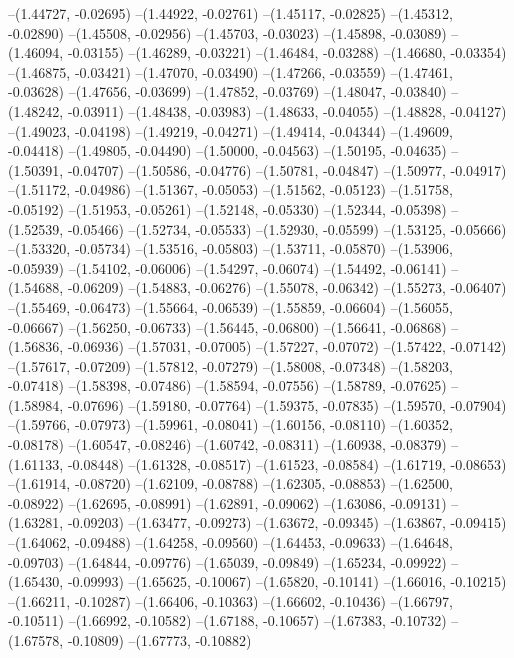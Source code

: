--(1.44727, -0.02695)
--(1.44922, -0.02761)
--(1.45117, -0.02825)
--(1.45312, -0.02890)
--(1.45508, -0.02956)
--(1.45703, -0.03023)
--(1.45898, -0.03089)
--(1.46094, -0.03155)
--(1.46289, -0.03221)
--(1.46484, -0.03288)
--(1.46680, -0.03354)
--(1.46875, -0.03421)
--(1.47070, -0.03490)
--(1.47266, -0.03559)
--(1.47461, -0.03628)
--(1.47656, -0.03699)
--(1.47852, -0.03769)
--(1.48047, -0.03840)
--(1.48242, -0.03911)
--(1.48438, -0.03983)
--(1.48633, -0.04055)
--(1.48828, -0.04127)
--(1.49023, -0.04198)
--(1.49219, -0.04271)
--(1.49414, -0.04344)
--(1.49609, -0.04418)
--(1.49805, -0.04490)
--(1.50000, -0.04563)
--(1.50195, -0.04635)
--(1.50391, -0.04707)
--(1.50586, -0.04776)
--(1.50781, -0.04847)
--(1.50977, -0.04917)
--(1.51172, -0.04986)
--(1.51367, -0.05053)
--(1.51562, -0.05123)
--(1.51758, -0.05192)
--(1.51953, -0.05261)
--(1.52148, -0.05330)
--(1.52344, -0.05398)
--(1.52539, -0.05466)
--(1.52734, -0.05533)
--(1.52930, -0.05599)
--(1.53125, -0.05666)
--(1.53320, -0.05734)
--(1.53516, -0.05803)
--(1.53711, -0.05870)
--(1.53906, -0.05939)
--(1.54102, -0.06006)
--(1.54297, -0.06074)
--(1.54492, -0.06141)
--(1.54688, -0.06209)
--(1.54883, -0.06276)
--(1.55078, -0.06342)
--(1.55273, -0.06407)
--(1.55469, -0.06473)
--(1.55664, -0.06539)
--(1.55859, -0.06604)
--(1.56055, -0.06667)
--(1.56250, -0.06733)
--(1.56445, -0.06800)
--(1.56641, -0.06868)
--(1.56836, -0.06936)
--(1.57031, -0.07005)
--(1.57227, -0.07072)
--(1.57422, -0.07142)
--(1.57617, -0.07209)
--(1.57812, -0.07279)
--(1.58008, -0.07348)
--(1.58203, -0.07418)
--(1.58398, -0.07486)
--(1.58594, -0.07556)
--(1.58789, -0.07625)
--(1.58984, -0.07696)
--(1.59180, -0.07764)
--(1.59375, -0.07835)
--(1.59570, -0.07904)
--(1.59766, -0.07973)
--(1.59961, -0.08041)
--(1.60156, -0.08110)
--(1.60352, -0.08178)
--(1.60547, -0.08246)
--(1.60742, -0.08311)
--(1.60938, -0.08379)
--(1.61133, -0.08448)
--(1.61328, -0.08517)
--(1.61523, -0.08584)
--(1.61719, -0.08653)
--(1.61914, -0.08720)
--(1.62109, -0.08788)
--(1.62305, -0.08853)
--(1.62500, -0.08922)
--(1.62695, -0.08991)
--(1.62891, -0.09062)
--(1.63086, -0.09131)
--(1.63281, -0.09203)
--(1.63477, -0.09273)
--(1.63672, -0.09345)
--(1.63867, -0.09415)
--(1.64062, -0.09488)
--(1.64258, -0.09560)
--(1.64453, -0.09633)
--(1.64648, -0.09703)
--(1.64844, -0.09776)
--(1.65039, -0.09849)
--(1.65234, -0.09922)
--(1.65430, -0.09993)
--(1.65625, -0.10067)
--(1.65820, -0.10141)
--(1.66016, -0.10215)
--(1.66211, -0.10287)
--(1.66406, -0.10363)
--(1.66602, -0.10436)
--(1.66797, -0.10511)
--(1.66992, -0.10582)
--(1.67188, -0.10657)
--(1.67383, -0.10732)
--(1.67578, -0.10809)
--(1.67773, -0.10882)

